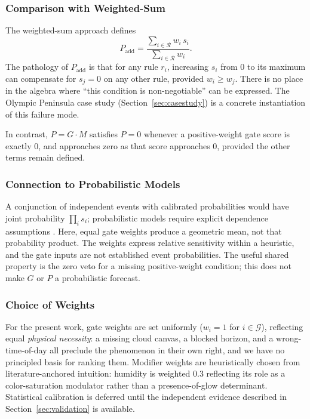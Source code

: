 \documentclass[11pt,a4paper]{article}
\begin{document}
\subsubsection{Comparison with Weighted-Sum}

The weighted-sum approach defines
\begin{equation}
P_{\text{add}} = \frac{\sum_{i \in \mathcal{R}} w_i \, s_i}{\sum_{i \in \mathcal{R}} w_i}.
\label{eq:weightedsum}
\end{equation}
The pathology of $P_{\text{add}}$ is that for any rule $r_i$, increasing $s_i$ from 0 to its maximum can compensate for $s_j = 0$ on any other rule, provided $w_i \geq w_j$. There is no place in the algebra where ``this condition is non-negotiable'' can be expressed. The Olympic Peninsula case study (Section~\ref{sec:casestudy}) is a concrete instantiation of this failure mode.

In contrast, $P = G \cdot M$ satisfies $P = 0$ whenever a positive-weight gate score is exactly 0, and approaches zero as that score approaches 0, provided the other terms remain defined.

\subsubsection{Connection to Probabilistic Models}

A conjunction of independent events with calibrated probabilities would have joint probability $\prod_i s_i$; probabilistic models require explicit dependence assumptions \citep{pearl1988probabilistic}. Here, equal gate weights produce a geometric mean, not that probability product. The weights express relative sensitivity within a heuristic, and the gate inputs are not established event probabilities. The useful shared property is the zero veto for a missing positive-weight condition; this does not make $G$ or $P$ a probabilistic forecast.

\subsubsection{Choice of Weights}

For the present work, gate weights are set uniformly ($w_i = 1$ for $i \in \mathcal{G}$), reflecting equal \emph{physical necessity}: a missing cloud canvas, a blocked horizon, and a wrong-time-of-day all preclude the phenomenon in their own right, and we have no principled basis for ranking them. Modifier weights are heuristically chosen from literature-anchored intuition: humidity is weighted 0.3 reflecting its role as a color-saturation modulator rather than a presence-of-glow determinant. Statistical calibration is deferred until the independent evidence described in Section~\ref{sec:validation} is available.
\end{document}
